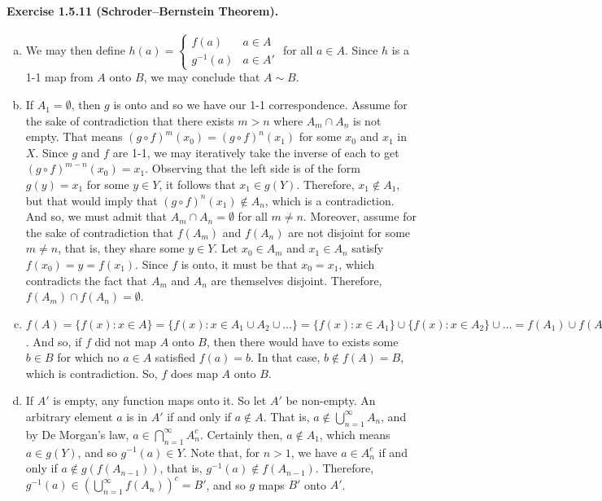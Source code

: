 \documentclass{article}
\newcommand{\inv}{^{-1}}
\begin{document}
\paragraph{Exercise 1.5.11 (Schroder–Bernstein Theorem).}
\begin{enumerate}[(a)]
    \item We may then define $h(a) = \begin{cases}
        f(a) & a\in A \\
        g\inv(a) & a\in A'
    \end{cases}$ for all $a\in A$. Since $h$ is a 1-1 map from $A$ onto $B$, we may conclude that $A\sim B$.
    \item If $A_1 = \emptyset$, then $g$ is onto and so we have our 1-1 correspondence. Assume for the sake of contradiction that there exists $m>n$ where $A_m\cap A_n$ is not empty. That means $(g\circ f)^m(x_0) = (g\circ f)^n(x_1)$ for some $x_0$ and $x_1$ in $X$. Since $g$ and $f$ are 1-1, we may iteratively take the inverse of each to get $(g\circ f)^{m-n}(x_0)=x_1$. Observing that the left side is of the form $g(y)=x_1$ for some $y \in Y$, it follows that $x_1 \in g(Y)$. Therefore, $x_1 \notin A_1$, but that would imply that $(g \circ f)^n(x_1)\notin A_n$, which is a contradiction. And so, we must admit that $A_m \cap A_n = \emptyset$ for all $m \neq n$. Moreover, assume for the sake of contradiction that $f(A_m)$ and $f(A_n)$ are not disjoint for some $m \neq n$, that is, they share some $y \in Y$. Let $x_0 \in A_m$ and $x_1 \in A_n$ satisfy $f(x_0)=y=f(x_1)$. Since $f$ is onto, it must be that $x_0 = x_1$, which contradicts the fact that $A_m$ and $A_n$ are themselves disjoint. Therefore, $f(A_m) \cap f(A_n) = \emptyset$.

    \item $f(A) = \{f(x):x\in A\} = \{f(x):x\in A_1 \cup A_2 \cup \ldots \} = \{f(x):x\in A_1\} \cup \{f(x): x\in A_2\} \cup \ldots = f(A_1)\cup f(A_2) \cup \ldots = \bigcup_{n=1}^\infty f(A_n) = B$. And so, if $f$ did not map $A$ onto $B$, then there would have to exists some $b\in B$ for which no $a\in A$ satisfied $f(a)=b$. In that case, $b \notin f(A) = B$, which is contradiction. So, $f$ does map $A$ onto $B$.

    \item If $A'$ is empty, any function maps onto it. So let $A'$ be non-empty. An arbitrary element $a$ is in $A'$ if and only if $a\notin A$. That is, $a \notin \bigcup_{n=1}^\infty A_n$, and by De Morgan's law, $a\in \bigcap_{n=1}^\infty A_n^c$. Certainly then, $a \notin A_1$, which means $a\in g(Y)$, and so $g\inv(a) \in Y$. Note that, for $n>1$, we have $a \in A_n^c$ if and only if $a\notin g(f(A_{n-1}))$, that is, $g\inv(a)\notin f(A_{n-1})$. Therefore, $g\inv(a) \in \left( \bigcup_{n=1}^\infty f(A_n) \right)^c = B'$, and so $g$ maps $B'$ onto $A'$.
\end{enumerate}
\end{document}
